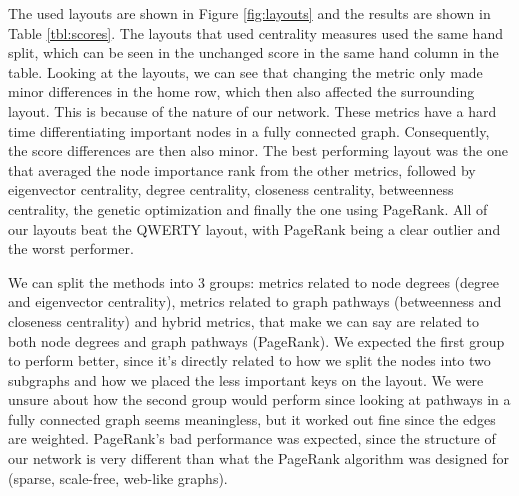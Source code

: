 \documentclass[9pt,twocolumn,twoside]{pnas-report}
\begin{document}
The used layouts are shown in Figure \ref{fig:layouts} and the results are shown in Table \ref{tbl:scores}.
The layouts that used centrality measures used the same hand split, which can be seen in the unchanged score in the same hand column in the table.
Looking at the layouts, we can see that changing the metric only made minor differences in the home row, which then also affected the surrounding layout.
This is because of the nature of our network.
These metrics have a hard time differentiating important nodes in a fully connected graph.
Consequently, the score differences are then also minor.
The best performing layout was the one that averaged the node importance rank from the other metrics, followed by eigenvector centrality, degree centrality, closeness centrality, betweenness centrality, the genetic optimization and finally the one using PageRank.
All of our layouts beat the QWERTY layout, with PageRank being a clear outlier and the worst performer.

We can split the methods into 3 groups: metrics related to node degrees (degree and eigenvector centrality), metrics related to graph pathways (betweenness and closeness centrality) and hybrid metrics, that make we can say are related to both node degrees and graph pathways (PageRank).
We expected the first group to perform better, since it's directly related to how we split the nodes into two subgraphs and how we placed the less important keys on the layout.
We were unsure about how the second group would perform since looking at pathways in a fully connected graph seems meaningless, but it worked out fine since the edges are weighted.
PageRank's bad performance was expected, since the structure of our network is very different than what the PageRank algorithm was designed for (sparse, scale-free, web-like graphs).
\end{document}
